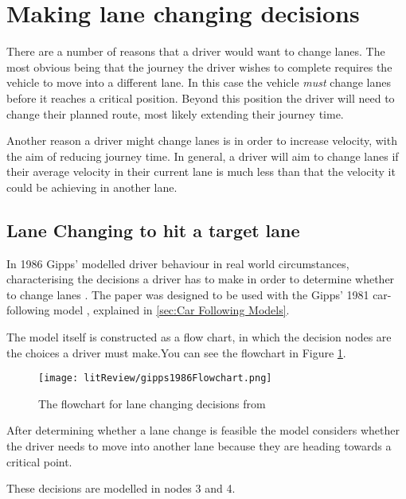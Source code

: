 \section{Making lane changing decisions}
\label{sec:Making lane changing decisions}
There are a number of reasons that a driver would want to change lanes. The most obvious being that the journey the driver wishes to complete requires the vehicle to move into a different lane. In this case the vehicle \emph{must} change lanes before it reaches a critical position. Beyond this position the driver will need to change their planned route, most likely extending their journey time. 

Another reason a driver might change lanes is in order to increase velocity, with the aim of reducing journey time. In general, a driver will aim to change lanes if their average velocity in their current lane is much less than that the velocity it could be achieving in another lane.

\subsection{Lane Changing to hit a target lane}
\label{subsec:Lane Changing to hit a target lane}
In 1986 Gipps' modelled driver behaviour in real world circumstances, characterising the decisions a driver has to make in order to determine whether to change lanes \citep{Gipps1986}. The paper was designed to be used with the Gipps' 1981 car-following model \citep{Gipps1981}, explained in \ref{sec:Car Following Models}.

The model itself is constructed as a flow chart, in which the decision nodes are the choices a driver must make.You can see the flowchart in Figure \ref{fig:Gipps1986Flowchart}.

\begin{figure}[htb]
\texttt{[image: litReview/gipps1986Flowchart.png]}
\caption{The flowchart for lane changing decisions from \citep{Gipps1986}}
\label{fig:Gipps1986Flowchart}
\end{figure}

After determining whether a lane change is feasible the model considers whether the driver needs to move into another lane because they are heading towards a critical point.

These decisions are modelled in nodes 3 and 4.

